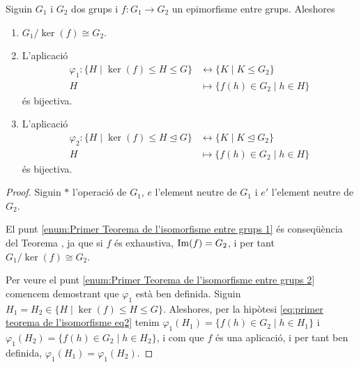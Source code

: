 \documentclass[../Apunts.tex]{subfiles}
\begin{document}
	\begin{theorem}
		\label{thm:Primer Teorema de l'isomorfisme entre grups}
			Siguin \(G_{1}\) i \(G_{2}\) dos grups i \(f\colon G_{1}\to G_{2}\) un epimorfisme entre grups. Aleshores
		\begin{enumerate}
			\item\label{enum:Primer Teorema de l'isomorfisme entre grups 1} \(G_{1}/\ker(f)\cong G_{2}\).
			\item\label{enum:Primer Teorema de l'isomorfisme entre grups 2} L'aplicació
			\begin{align}
			\label{eq:primer teorema de l'isomorfisme eq2}
			\varphi_{1}\colon\{H\mid\ker(f)\leq H\leq G\}&\longleftrightarrow\{K\mid K\leq G_{2}\}\\
			H&\longmapsto\{f(h)\in G_{2}\mid h\in H\}\nonumber
			\end{align}
			és bijectiva.
			\item\label{enum:Primer Teorema de l'isomorfisme entre grups 3} L'aplicació
			\begin{align}
			\label{eq:primer teorema de l'isomorfisme eq3}
			\varphi_{2}\colon\{H\mid\ker(f)\leq H\trianglelefteq G\}&\longleftrightarrow\{K\mid K\trianglelefteq G_{2}\}\\
			H&\longmapsto\{f(h)\in G_{2}\mid h\in H\}\nonumber
			\end{align}
			és bijectiva.
		\end{enumerate}
		\begin{proof}
			Siguin \(\ast\) l'operació de \(G_{1}\), \(e\) l'element neutre de \(G_{1}\) i \(e'\) l'element neutre de \(G_{2}\).
			
			El punt \eqref{enum:Primer Teorema de l'isomorfisme entre grups 1} és conseqüència del Teorema , ja que si \(f\) és exhaustiva, \(\operatorname{Im}(f)=G_{2}\), i per tant \(G_{1}/\ker(f)\cong G_{2}\).
			
			Per veure el punt \eqref{enum:Primer Teorema de l'isomorfisme entre grups 2} comencem demostrant que \(\varphi_{1}\) està ben definida. Siguin \(H_{1}=H_{2}\in\{H\mid\ker(f)\leq H\leq G\}\). Aleshores, per la hipòtesi \eqref{eq:primer teorema de l'isomorfisme eq2} tenim \(\varphi_{1}(H_{1})=\{f(h)\in G_{2}\mid h\in H_{1}\}\) i \(\varphi_{1}(H_{2})=\{f(h)\in G_{2}\mid h\in H_{2}\}\), i com que \(f\) és una aplicació, i per tant ben definida, \(\varphi_{1}(H_{1})=\varphi_{1}(H_{2})\).
			

\end{proof}
\end{theorem}
\end{document}

